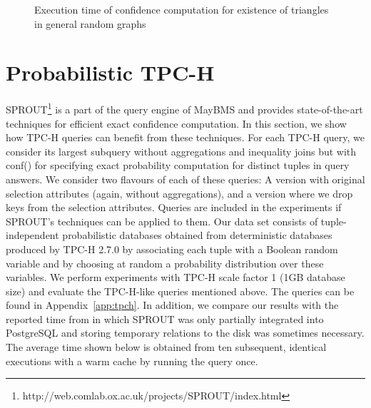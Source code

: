 \begin{figure}[htp]
\begin{center}
\begin{tabular}{ | c | c | c | c | }
  \end{tabular}
\end{center}       

\caption{Execution time of confidence computation for existence of triangles in general random graphs}

\label{fig:general-randgraph}
\end{figure}

\section{Probabilistic TPC-H}

SPROUT\footnote{http://web.comlab.ox.ac.uk/projects/SPROUT/index.html} is a part 
of the query engine of MayBMS and provides state-of-the-art techniques for efficient 
exact confidence computation. In this section, we show how TPC-H queries can 
benefit from these techniques. For each TPC-H query, we consider its largest subquery
without aggregations and inequality joins but with
conf() for specifying exact probability computation
for distinct tuples in query answers. We consider two
flavours of each of these queries: A version with original
selection attributes (again, without aggregations), and a version
where we drop keys from the selection attributes. Queries are included in the 
experiments if SPROUT's techniques can be applied to them. Our data set consists 
of tuple-independent probabilistic databases obtained from deterministic
databases produced by TPC-H 2.7.0 by associating each
tuple with a Boolean random variable and by choosing at random
a probability distribution over these variables. We perform experiments with TPC-H 
scale factor 1 (1GB database size) and evaluate the 
TPC-H-like queries mentioned above. The queries can 
be found in Appendix~\ref{app:tpch}. In addition, we compare our results 
with the reported time from \cite{OHK2008} in which SPROUT was only partially 
integrated into PostgreSQL and storing temporary relations to the disk was 
sometimes necessary. The average time shown below is obtained from ten subsequent, 
identical executions with a warm cache by running the query once.

